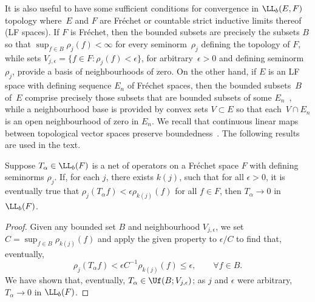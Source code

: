  It is also useful to have some sufficient conditions for convergence in $\LL_b(E,F)$ topology where~$E$ and $F$ are Fr\'echet or countable strict inductive limits thereof (LF spaces). If $F$ is Fr\'echet, then the bounded subsets are precisely the subsets $B$ so that $\sup_{f\in B} \rho_j(f)<\infty$ for every seminorm~$\rho_j$ defining the topology of $F$, while sets $V_{j,\epsilon}=\{f\in F\colon\rho_j(f)<\epsilon\}$, for arbitrary~$\epsilon>0$ and defining seminorm $\rho_j$, provide a basis of neighbourhoods of zero. On the other hand, if $E$ is an LF space with defining sequence $E_n$ of Fr\'echet spaces, then
 the bounded subsets~$B$ of~$E$ comprise precisely those subsets that are bounded subsets of some $E_n$~\cite[Proposition~14.6]{Treves:TVS}, while a neighbourhood base is provided by convex sets $V\subset E$ so that
 each~$V\cap E_n$ is an open neighbourhood of zero in $E_n$.
 We recall that continuous linear maps between topological vector spaces preserve boundedness~\cite[Proposition~14.2]{Treves:TVS}. The following results are used in the text.
 \begin{Lemma} \label{lem:LbFrechet}
 	Suppose $T_\alpha\in \LL_b(F)$ is a net of operators on a Fr\'echet space $F$ with defining seminorms $\rho_j$. If, for each $j$, there exists $k(j)$,
 	such that for all $\epsilon>0$, it is eventually true that $\rho_j(T_\alpha f)<\epsilon\rho_{k(j)}(f)$ for all $f\in F$, then $T_\alpha\to 0$ in $\LL_b(F)$.
 \end{Lemma}
 \begin{proof}
 	Given any bounded set $B$ and
 	neighbourhood $V_{j,\epsilon}$, we set $C=\sup_{f\in B}\rho_{k(j)}(f)$ and apply the given property to $\epsilon/C$ to find that, eventually,{\samepage
 	\begin{equation*}
 		\rho_j(T_\alpha f)<\epsilon C^{-1} \rho_{k(j)}(f) \le \epsilon, \qquad \forall f\in B.
 	\end{equation*}
 	We have shown that, eventually, $T_\alpha\in \Uf(B;V_{j,\epsilon})$; as $j$ and $\epsilon$ were arbitrary, $T_\alpha\to 0$ in $\LL_b(F)$.}
 \end{proof}

